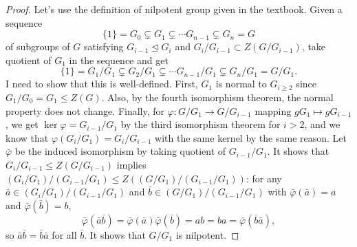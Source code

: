 \documentclass[a4paper, 12pt]{article}
\theoremstyle{Mydefinition}
\theoremstyle{Mytheorem}
\begin{document}
\begin{enumerate}
\begin{proof}
    Let's use the definition of nilpotent group given in the textbook. Given a sequence
    \begin{equation}
        \{1\}=G_0\subsetneq G_1\subsetneq\cdots G_{n-1}\subsetneq G_n = G
    \end{equation}
    of subgroups of $G$ satisfying $G_{i-1}\trianglelefteq G_i$ and $G_i/G_{i-1}\subset Z(G/G_{i-1})$, take quotient of $G_1$ in the sequence and get
    \begin{equation}
        \{1\} = G_1/G_1\subsetneq G_2/G_1\subsetneq\cdots G_{n-1}/G_1\subsetneq G_n/G_1 = G/G_1.
    \end{equation}
    I need to show that this is well-defined. First, $G_1$ is normal to $G_{i\geq 2}$ since $G_1/G_0 = G_1\leq Z(G)$. Also, by the fourth isomorphism theorem, the normal property does not change. Finally, for $\varphi:G/G_1\rightarrow G/G_{i-1}$ mapping $g G_1\mapsto g G_{i-1}$, we get $\ker \varphi = G_{i-1}/G_1$ by the third isomorphism theorem for $i>2$, and we know that $\varphi(G_i/G_1) = G_i/G_{i-1}$ with the same kernel by the same reason. Let $\bar{\varphi}$ be the induced isomorphism by taking quotient of $G_{i-1}/G_1$. It shows that $G_i/G_{i-1}\leq Z(G/G_{i-1})$ implies $(G_i/G_1)/(G_{i-1}/G_1)\leq Z((G/G_1)/(G_{i-1}/G_1))$: for any $\bar{a}\in (G_i/G_1)/(G_{i-1}/G_1)$ and $\bar{b}\in (G/G_1)/(G_{i-1}/G_1)$ with $\bar{\varphi}(\bar{a})=a$ and $\bar{\varphi}(\bar{b})=b$,
    \begin{equation}
        \bar{\varphi}(\bar{a}\bar{b}) = \bar{\varphi}(\bar{a})\bar{\varphi}(\bar{b}) = ab = ba = \bar{\varphi}(\bar{b}\bar{a}),
    \end{equation}
    so $\bar{a}\bar{b}=\bar{b}\bar{a}$ for all $\bar{b}$. It shows that $G/G_1$ is nilpotent.
    

\end{proof}
\end{enumerate}
\end{document}
